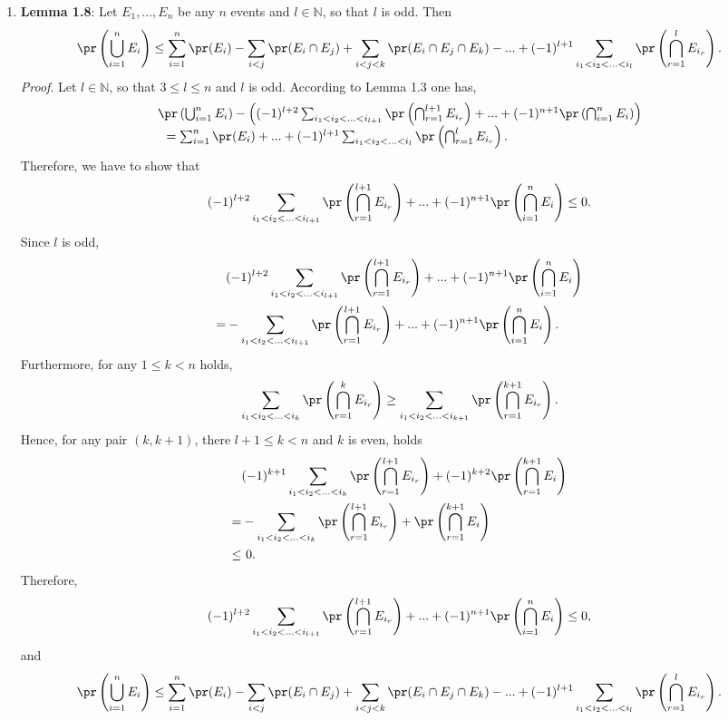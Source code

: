 \begin{enumerate}
  \item[(b)] \textbf{Lemma 1.8}: Let $E_1,...,E_n$ be any $n$ events and $l \in
  \mathbb{N}$, so that $l$ is odd. Then
  \[
    \pr\left(\bigcup_{i=1}^n E_i\right)
    \leq \sum_{i=1}^n \pr(E_i) - \sum_{i<j}\pr(E_i \cap E_j) + \sum_{i<j<k}\pr(E_i \cap E_j \cap E_k) - ... + (-1)^{l+1} \sum_{i_1<i_2< ... <i_l} \pr\left(\bigcap_{r=1}^lE_{i_r}\right).
  \]
  \textit{Proof}. Let $l \in \mathbb{N}$, so that $3 \leq l \leq n$ and $l$ is odd. According to Lemma 1.3 one has,
  \begin{align*}
  \begin{tabular}{l}
    $\pr\left(\bigcup_{i=1}^n E_i\right) -
    \left(
      (-1)^{l+2} \sum_{i_1<i_2< ... <i_{l+1}} \pr\left(\bigcap_{r=1}^{l+1} E_{i_r}\right) + ... +
      (-1)^{n+1} \pr\left(\bigcap_{i=1}^n E_{i}\right)
    \right)$ \\
    $\ \ = \sum_{i=1}^n \pr(E_i) + ... + (-1)^{l+1} \sum_{i_1<i_2< ... <i_l}
      \pr\left(\bigcap_{r=1}^lE_{i_r}\right).$
  \end{tabular}
  \end{align*}
  Therefore, we have to show that
  \[
    (-1)^{l+2} \sum_{i_1<i_2< ... <i_{l+1}} \pr\left(\bigcap_{r=1}^{l+1} E_{i_r}\right)
    + ... + (-1)^{n+1} \pr\left(\bigcap_{i=1}^n E_{i}\right) \leq 0.
  \]
  Since $l$ is odd,
  \begin{align*}
      &(-1)^{l+2} \sum_{i_1<i_2< ... <i_{l+1}} \pr\left(\bigcap_{r=1}^{l+1} E_{i_r}\right) + ... + (-1)^{n+1} \pr\left(\bigcap_{i=1}^n E_{i}\right) \\
    = &-\sum_{i_1<i_2< ... <i_{l+1}} \pr\left(\bigcap_{r=1}^{l+1} E_{i_r}\right)
      + ... + (-1)^{n+1} \pr\left(\bigcap_{i=1}^n E_{i}\right).
  \end{align*}
  Furthermore, for any $1 \leq k < n$ holds,
  \[
    \sum_{i_1<i_2< ... <i_k} \pr\left(\bigcap_{r=1}^k E_{i_r}\right)
    \geq \sum_{i_1<i_2< ... <i_{k+1}} \pr\left(\bigcap_{r=1}^{k+1} E_{i_r}\right).
  \]
  Hence, for any pair $(k,k+1)$, there $l+1 \leq k < n$ and $k$ is even, holds
  \begin{align*}
    \   &(-1)^{k+1} \sum_{i_1<i_2< ... <i_{k}} \pr\left(\bigcap_{r=1}^{l+1} E_{i_r}\right) + (-1)^{k+2} \pr\left( \bigcap_{r=1}^{k+1} E_{i} \right) \\
    =   &-\sum_{i_1<i_2< ... <i_k} \pr\left( \bigcap_{r=1}^{l+1} E_{i_r} \right) + \pr\left(\bigcap_{r=1}^{k+1} E_{i}\right) \\
    \leq &\ 0.
  \end{align*}
  Therefore,
  \[
    (-1)^{l+2} \sum_{i_1<i_2< ... <i_{l+1}} \pr\left(\bigcap_{r=1}^{l+1} E_{i_r}\right)
    + ... + (-1)^{n+1} \pr\left(\bigcap_{i=1}^n E_{i}\right) \leq 0,
  \]
  and
  \[
    \pr\left(\bigcup_{i=1}^n E_i\right)
    \leq \sum_{i=1}^n \pr(E_i) - \sum_{i<j}\pr(E_i \cap E_j) + \sum_{i<j<k}\pr(E_i \cap E_j \cap E_k) - ... + (-1)^{l+1} \sum_{i_1<i_2< ... <i_l} \pr\left(\bigcap_{r=1}^lE_{i_r}\right).
  \]


\end{enumerate}
